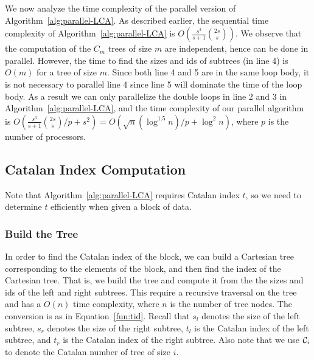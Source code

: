 We now analyze the time complexity of the parallel version of
Algorithm~\ref{alg:parallel-LCA}.  As described earlier, the
sequential time complexity of Algorithm~\ref{alg:parallel-LCA} is
$O(\frac{s^3}{s+1} \binom{2s}{s})$.  We observe that the computation
of the $C_m$ trees of size $m$ are independent, hence can be done in
parallel.  However, the time to find the sizes and ids of subtrees (in
line 4) is $O(m)$ for a tree of size $m$.  Since both line 4 and 5 are
in the same loop body, it is not necessary to parallel line 4 since
line 5 will dominate the time of the loop body.  As a result we can
only parallelize the double loops in line 2 and 3 in
Algorithm~\ref{alg:parallel-LCA}, and the time complexity of our
parallel algorithm is $O(\frac{s^3}{s+1} \binom{2s}{s} / p + s^2) =
O(\sqrt{n} (\log ^{1.5} n) / p + \log^2 n )$, where $p$ is the number
of processors.



\subsection{Catalan Index Computation}

Note that Algorithm~\ref{alg:parallel-LCA} requires Catalan index $t$,
so we need to determine $t$ efficiently when given a block of data.


\subsubsection{Build the Tree}

In order to find the Catalan index of the block, we can build a
Cartesian tree corresponding to the elements of the block, and then
find the index of the Cartesian tree.  That is, we build the tree and
compute it from the the sizes and ids of the left and right subtrees.
This require a recursive traversal on the tree and has a $O(n)$ time
complexity, where $n$ is the number of tree nodes.  The conversion is
as in Equation~\ref{fun:tid}.  Recall that $s_l$ denotes the size of
the left subtree, $s_r$ denotes the size of the right subtree, $t_l$
is the Catalan index of the left subtree, and $t_r$ is the Catalan
index of the right subtree.  Also note that we use ${\cal C}_i$ to
  denote the Catalan number of tree of size $i$.

